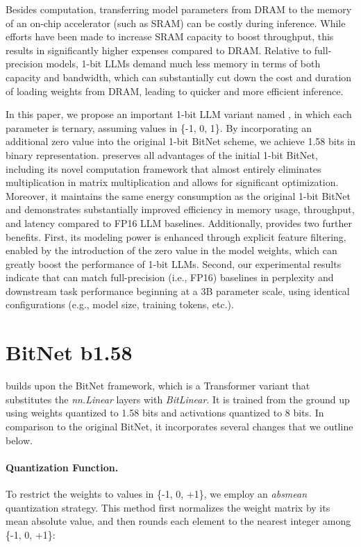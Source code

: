 Besides computation, transferring model parameters from DRAM to the memory of an on-chip accelerator (such as SRAM) can be costly during inference. While efforts have been made to increase SRAM capacity to boost throughput, this results in significantly higher expenses compared to DRAM. Relative to full-precision models, 1-bit LLMs demand much less memory in terms of both capacity and bandwidth, which can substantially cut down the cost and duration of loading weights from DRAM, leading to quicker and more efficient inference.

In this paper, we propose an important 1-bit LLM variant named \textbf{}, in which each parameter is ternary, assuming values in \{-1, 0, 1\}. By incorporating an additional zero value into the original 1-bit BitNet scheme, we achieve 1.58 bits in binary representation.  preserves all advantages of the initial 1-bit BitNet, including its novel computation framework that almost entirely eliminates multiplication in matrix multiplication and allows for significant optimization. Moreover, it maintains the same energy consumption as the original 1-bit BitNet and demonstrates substantially improved efficiency in memory usage, throughput, and latency compared to FP16 LLM baselines. Additionally,  provides two further benefits. First, its modeling power is enhanced through explicit feature filtering, enabled by the introduction of the zero value in the model weights, which can greatly boost the performance of 1-bit LLMs. Second, our experimental results indicate that  can match full-precision (i.e., FP16) baselines in perplexity and downstream task performance beginning at a 3B parameter scale, using identical configurations (e.g., model size, training tokens, etc.).

\section{BitNet b1.58}

 builds upon the BitNet framework, which is a Transformer variant that substitutes the \emph{nn.Linear} layers with \emph{BitLinear}. It is trained from the ground up using weights quantized to 1.58 bits and activations quantized to 8 bits. In comparison to the original BitNet, it incorporates several changes that we outline below.

\paragraph{Quantization Function.} To restrict the weights to values in \{-1, 0, +1\}, we employ an \emph{absmean} quantization strategy. This method first normalizes the weight matrix by its mean absolute value, and then rounds each element to the nearest integer among \{-1, 0, +1\}:

